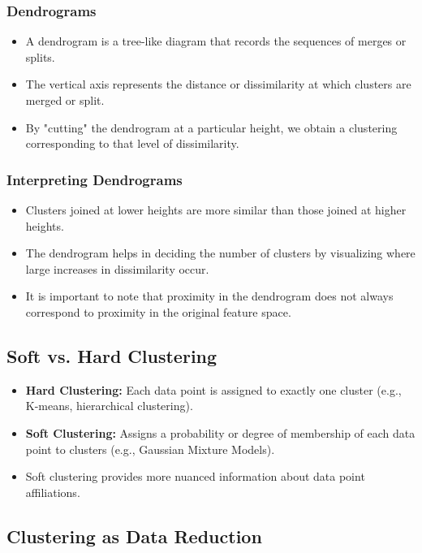 \documentclass{article}
\begin{document}
\subsubsection{Dendrograms}

\begin{itemize}
    \item A dendrogram is a tree-like diagram that records the sequences of merges or splits.
    \item The vertical axis represents the distance or dissimilarity at which clusters are merged or split.
    \item By "cutting" the dendrogram at a particular height, we obtain a clustering corresponding to that level of dissimilarity.
\end{itemize}

\subsubsection{Interpreting Dendrograms}

\begin{itemize}
    \item Clusters joined at lower heights are more similar than those joined at higher heights.
    \item The dendrogram helps in deciding the number of clusters by visualizing where large increases in dissimilarity occur.
    \item It is important to note that proximity in the dendrogram does not always correspond to proximity in the original feature space.
\end{itemize}

\subsection{Soft vs. Hard Clustering}

\begin{itemize}
    \item \textbf{Hard Clustering:} Each data point is assigned to exactly one cluster (e.g., K-means, hierarchical clustering).
    \item \textbf{Soft Clustering:} Assigns a probability or degree of membership of each data point to clusters (e.g., Gaussian Mixture Models).
    \item Soft clustering provides more nuanced information about data point affiliations.
\end{itemize}

\subsection{Clustering as Data Reduction}
\end{document}
